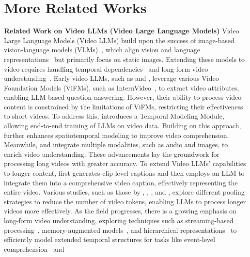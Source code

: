 \section{More Related Works}\label{app:related_work}
\noindent \textbf{Related Work on Video LLMs (Video Large Language Models)}
Video Large Language Models (Video LLMs) build upon the success of image-based vision-language models (VLMs)~\cite{liu2023llava,internlmxcomposer,internlmxcomposer2,internlmxcomposer2_5,internlmxcomposer2_5_reward,chen2023sharegpt4v,chen2024open,liu2024rar,liu2024mmdu,huang2024operaalleviatinghallucinationmultimodal,liu2024mia,xing2024pyramiddropacceleratinglargevisionlanguage}, which align vision and language representations~\cite{radford2021learningtransferablevisualmodels,zhang2024longclip,sun2023alphaclip} but primarily focus on static images. Extending these models to video requires handling temporal dependencies~\cite{xu2021videoclipcontrastivepretrainingzeroshot,lei2021moreclipbertvideoandlanguagelearning,bertasius2021spacetimeattentionneedvideo,huang2023vtimellmempowerllmgrasp} and long-form video understanding~\cite{wang2024longllavascalingmultimodalllms,chen2024longvilascalinglongcontextvisual,zhang2024longva}. Early video LLMs, such as \citet{wang2023chatvideotrackletcentricmultimodalversatile} and \citet{2023videochat}, leverage various Video Foundation Models (ViFMs), such as InternVideo~\cite{wang2022internvideogeneralvideofoundation}, to extract video attributes, enabling LLM-based question answering. However, their ability to process video content is constrained by the limitations of ViFMs, restricting their effectiveness to short videos. To address this, \citet{luo2023valleyvideoassistantlarge} introduces a Temporal Modeling Module, allowing end-to-end training of LLMs on video data. Building on this approach, \citet{Maaz2023VideoChatGPT} further enhances spatiotemporal modeling to improve video comprehension. Meanwhile, \citet{zhang2023videollamainstructiontunedaudiovisuallanguage} and \citet{lin2023videollava} integrate multiple modalities, such as audio and images, to enrich video understanding. These advancements lay the groundwork for processing long videos with greater accuracy. To extend Video LLMs’ capabilities to longer content, \citet{lin2023mmvidadvancingvideounderstanding} first generates clip-level captions and then employs an LLM to integrate them into a comprehensive video caption, effectively representing the entire video. Various studies, such as those by \citet{li2024llamavid}, \citet{jin2023chatunivi}, \citet{xu2024pllavaparameterfreellava}, and \citet{zhang2025llavaminiefficientimagevideo}, explore different pooling strategies to reduce the number of video tokens, enabling LLMs to process longer videos more effectively. As the field progresses, there is a growing emphasis on long-form video understanding, exploring techniques such as streaming-based processing~\cite{qian2025dispiderenablingvideollms,li2025ovobenchfarvideollmsrealworld}, memory-augmented models~\cite{qian2024streaminglongvideounderstanding,ding2024sam2longenhancingsam2}, and hierarchical representations~\cite{wang2024videotreeadaptivetreebasedvideo} to efficiently model extended temporal structures for tasks like event-level comprehension~\cite{liu2024etbenchopenendedeventlevel} and 